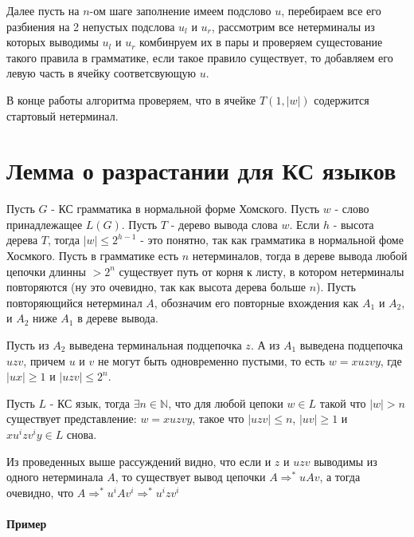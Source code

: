 Далее пусть на $n$-ом шаге заполнение имеем подслово $u$, перебираем все его разбиения на 2 непустых подслова $u_l$ и $u_r$, рассмотрим все нетерминалы
из которых выводимы $u_l$ и $u_r$ комбинруем их в пары и проверяем сущестование такого правила в грамматике, если такое правило существует, то добавляем
его левую часть в ячейку соответсвующую $u$.

В конце работы алгоритма проверяем, что в ячейке $T(1,|w|)$ содержится стартовый нетерминал.

\section{Лемма о разрастании для КС языков}

Пусть $G$ - КС грамматика в нормальной форме Хомского. Пусть $w$ - слово принадлежащее $L(G)$. Пусть $T$ - дерево вывода слова $w$. Если $h$ - высота дерева
$T$, тогда $|w| \le 2^{h-1}$ - это понятно, так как грамматика в нормальной фоме Хосмкого. Пусть в грамматике есть $n$ нетерминалов, тогда в дереве вывода
любой цепочки длинны $> 2^n$ существует путь от корня к листу, в котором нетерминалы повторяются (ну это очевидно, так как высота дерева больше $n$). Пусть
повторяющийся нетерминал $A$, обозначим его повторные вхождения как $A_1$ и $A_2$, и $A_2$ ниже $A_1$ в дереве вывода.

Пусть из $A_2$ выведена терминальная подцепочка $z$. А из $A_1$ выведена подцепочка $uzv$, причем $u$ и $v$ не могут быть одновременно пустыми, то есть
$w = x uzv y$, где $|ux| \ge 1$ и $|uzv| \le 2^n$.

\begin{Lem}[о разрастании]
Пусть $L$ - КС язык, тогда $\exists n \in \mathbb{N}$, что для любой цепоки $w \in L$ такой что $|w| > n$ существует представление:
$w = xuzvy$, такое что $|uzv| \le n$, $|uv| \ge 1$ и $xu^izv^iy \in L$ снова.
\end{Lem}

\begin{Proof}
Из проведенных выше рассуждений видно, что если и $z$ и $uzv$ выводимы из одного нетерминала $A$, то существует вывод цепочки $A \Rightarrow^{*} uAv$, а
тогда очевидно, что $A \Rightarrow^{*} u^iAv^i \Rightarrow^{*} u^izv^i$
\end{Proof}

\paragraph{Пример}

